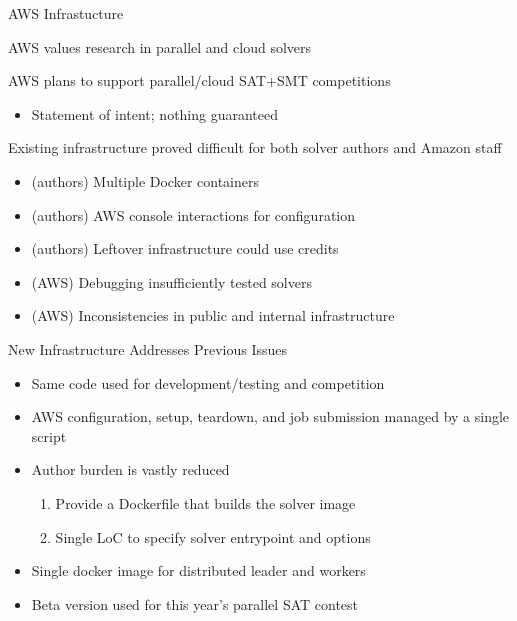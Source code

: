\documentclass{beamer}
\begin{document}
\begin{frame}{AWS Infrastucture}

\large

AWS values research in parallel and cloud solvers
\bigskip

AWS plans to support parallel/cloud SAT+SMT competitions\!\!\!\!\!
\begin{itemize}
\item Statement of intent; nothing guaranteed
\end{itemize}

\bigskip

Existing infrastructure proved difficult for both solver authors and Amazon staff
\begin{itemize}
\item (authors) Multiple Docker containers\\[5pt]
\item (authors) AWS console interactions for configuration\\[5pt]
\item (authors) Leftover infrastructure could use credits\\[5pt]
\item (AWS) Debugging insufficiently tested solvers\\[5pt]
\item (AWS) Inconsistencies in public and internal infrastructure
\end{itemize}
\end{frame}

\begin{frame}{New Infrastructure Addresses Previous Issues}

\large

\begin{itemize}
\item Same code used for development/testing and competition\!\!\!\!\\[10pt]
\item AWS configuration, setup, teardown, and job submission managed by a single script\\[10pt]
\item Author burden is vastly reduced
\begin{enumerate}
\normalsize
\item Provide a Dockerfile that builds the solver image
\item Single LoC to specify solver entrypoint and options\\[10pt]
\end{enumerate}
\item Single docker image for distributed leader and workers\\[10pt]
\item Beta version used for this year’s parallel SAT contest
\end{itemize}

\end{frame}
\end{document}
